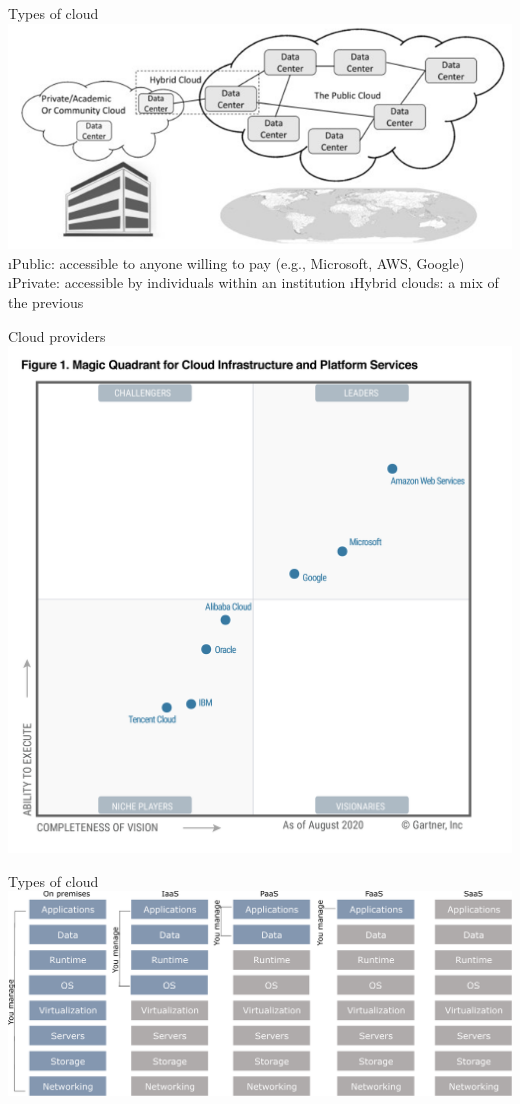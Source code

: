 \begin{frame}{Types of cloud}
\includegraphics[height=.6\textheight]{imgs/cloud_types.png}
\i Public: accessible to anyone willing to pay (e.g., Microsoft, AWS, Google)
\i Private: accessible by individuals within an institution
\i Hybrid clouds: a mix of the previous
\end{frame}

\begin{frame}{Cloud providers}
\includegraphics[height=.8\textheight]{imgs/cloud_providers.png}
\end{frame}

\begin{frame}{Types of cloud}
\includegraphics[height=.6\textheight]{imgs/cloud_paastosaas.pdf}
\end{frame}

